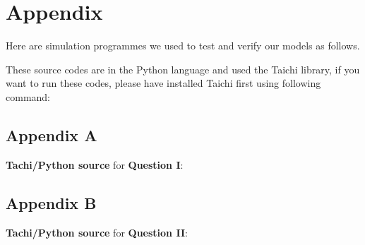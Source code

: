 \documentclass{mcmthesis}
\begin{document}
\newpage
\section{Appendix}
Here are simulation programmes we used to test and verify our models as follows. \par
These source codes are in the Python language and used the Taichi library, if you want to run these codes, please have installed Taichi first using following command:



\subsection{Appendix A}
\textbf{\textcolor[rgb]{0.98,0.00,0.00}{Tachi/Python source}} for \textbf{\textcolor[rgb]{0.00,0.00,0.98}{Question I}}:


\subsection{Appendix B}
\textbf{\textcolor[rgb]{0.98,0.00,0.00}{Tachi/Python source}} for \textbf{\textcolor[rgb]{0.00,0.00,0.98}{Question II}}:

\end{document}
